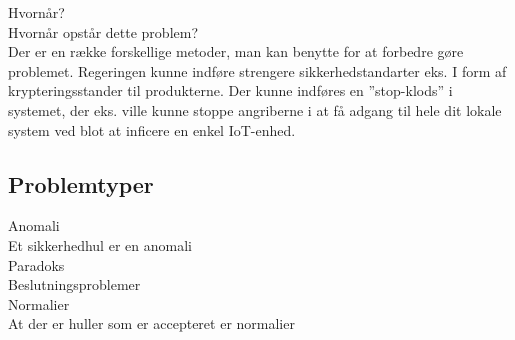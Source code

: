         Hvornår?\\
        Hvornår opstår dette problem?\\
        Der er en række forskellige metoder, man kan benytte for at forbedre gøre problemet. Regeringen kunne indføre strengere sikkerhedstandarter eks. I form af krypteringsstander til produkterne. Der kunne indføres en ”stop-klods” i systemet, der eks. ville kunne stoppe angriberne i at få adgang til hele dit lokale system ved blot at inficere en enkel IoT-enhed.\\
        
    
    \subsection{Problemtyper}
    Anomali\\
    Et sikkerhedhul er en anomali\\
    Paradoks\\
    Beslutningsproblemer\\
    Normalier\\
    At der er huller som er accepteret er normalier\\
